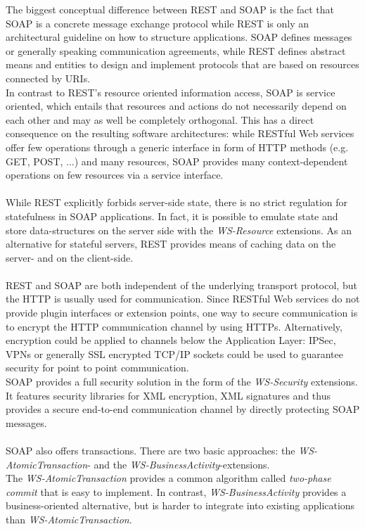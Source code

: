 The biggest conceptual difference between REST and SOAP is the fact that SOAP is a concrete message exchange protocol while REST is only an architectural guideline on how to structure applications. SOAP defines messages or generally speaking communication agreements, while REST defines abstract means and entities to design and implement protocols that are based on resources connected by URIs.
\\
In contrast to REST's resource oriented information access, SOAP is service oriented, which entails that resources and actions do not necessarily depend on each other and may as well be completely orthogonal. This has a direct consequence on the resulting software architectures: while RESTful Web services offer few operations through a generic interface in form of HTTP methods (e.g. GET, POST, ...) and many resources, SOAP provides many context-dependent operations on few resources via a service interface.
\\ \\
While REST explicitly forbids server-side state, there is no strict regulation for statefulness in SOAP applications. In fact, it is possible to emulate state and store data-structures on the server side with the \emph{WS-Resource} extensions\cite{WSRES}. As an alternative for stateful servers, REST provides means of caching data on the server- and on the client-side.
\\ \\
REST and SOAP are both independent of the underlying transport protocol, but the HTTP is usually used for communication. Since RESTful Web services do not provide plugin interfaces or extension points, one way to secure communication is to encrypt the HTTP communication channel by using HTTPs. Alternatively, encryption could be applied to  channels below the Application Layer: IPSec, VPNs or generally SSL encrypted TCP/IP sockets could be used to guarantee security for point to point communication.
\\
SOAP provides a full security solution in the form of the \emph{WS-Security} extensions. \cite{WSSEC} It features security libraries for XML encryption, XML signatures and thus provides a secure end-to-end communication channel by directly protecting SOAP messages.
\\ \\
SOAP also offers transactions. There are two basic approaches: the \emph{WS-AtomicTransaction}- and the \emph{WS-BusinessActivity}-extensions.
\\ 
The \emph{WS-AtomicTransaction} \cite{WSATOMIC} provides a common algorithm called \emph{two-phase commit} that is easy to implement. In contrast, \emph{WS-BusinessActivity} provides a business-oriented alternative, but is harder to integrate into existing applications than \emph{WS-AtomicTransaction}. \cite{RESTFULWEB}
